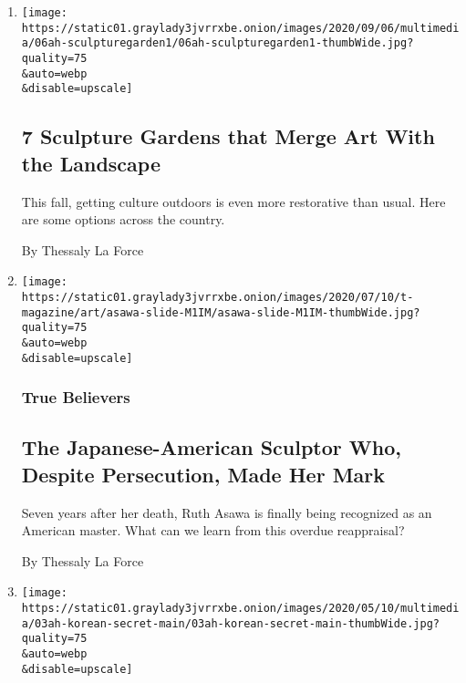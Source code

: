 \begin{enumerate}
\def\labelenumi{\arabic{enumi}.}
\item
  \href{/2020/09/05/at-home/visit-sculpture-gardens.html}{}

  \texttt{[image: https://static01.graylady3jvrrxbe.onion/images/2020/09/06/multimedia/06ah-sculpturegarden1/06ah-sculpturegarden1-thumbWide.jpg?quality=75\\\&auto=webp\\\&disable=upscale]}

  \hypertarget{7-sculpture-gardens-that-merge-art-with-the-landscape}{%
  \subsection{7 Sculpture Gardens that Merge Art With the
  Landscape}\label{7-sculpture-gardens-that-merge-art-with-the-landscape}}

  This fall, getting culture outdoors is even more restorative than
  usual. Here are some options across the country.

  By Thessaly La Force
\item
  \href{/2020/07/20/t-magazine/ruth-asawa.html}{}

  \texttt{[image: https://static01.graylady3jvrrxbe.onion/images/2020/07/10/t-magazine/art/asawa-slide-M1IM/asawa-slide-M1IM-thumbWide.jpg?quality=75\\\&auto=webp\\\&disable=upscale]}

  \hypertarget{true-believers}{%
  \subsubsection{True Believers}\label{true-believers}}

  \hypertarget{the-japanese-american-sculptor-who-despite-persecution-made-her-mark}{%
  \subsection{The Japanese-American Sculptor Who, Despite Persecution,
  Made Her
  Mark}\label{the-japanese-american-sculptor-who-despite-persecution-made-her-mark}}

  Seven years after her death, Ruth Asawa is finally being recognized as
  an American master. What can we learn from this overdue reappraisal?

  By Thessaly La Force
\item
  \href{/2020/05/07/at-home/coronavirus-free-korean-films.html}{}

  \texttt{[image: https://static01.graylady3jvrrxbe.onion/images/2020/05/10/multimedia/03ah-korean-secret-main/03ah-korean-secret-main-thumbWide.jpg?quality=75\\\&auto=webp\\\&disable=upscale]}


\end{enumerate}
